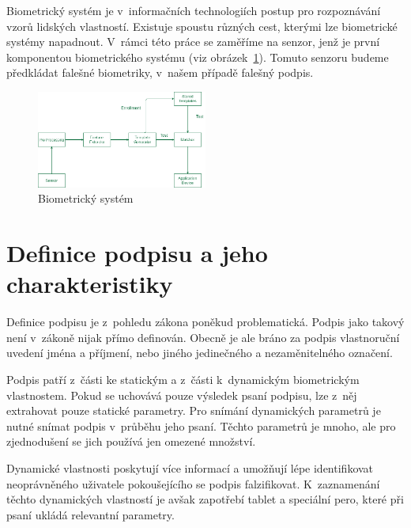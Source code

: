 Biometrický systém je v~informačních technologiích postup pro rozpoznávání vzorů lidských vlastností.       %
Existuje spoustu různých cest, kterými lze biometrické systémy napadnout.                                   %
V~rámci této práce se zaměříme na senzor, jenž je první komponentou biometrického systému (viz obrázek~\ref{fig:biometricky_system}). %
Tomuto senzoru budeme předkládat falešné biometriky, v~našem případě falešný podpis.~\cite{DrahanskýMartin2011}%

\begin{figure}[h]
  \centering
  \includegraphics[width=0.5\textwidth]{obrazky-figures/biometricky_system.png}
  \caption{Biometrický systém~\cite{geeksforGeeks2022}}  %
  \label{fig:biometricky_system}
\end{figure}

\section{Definice podpisu a jeho charakteristiky}
Definice podpisu je z~pohledu zákona poněkud problematická. 
Podpis jako takový není v~zákoně nijak přímo definován. 
Obecně je ale bráno za podpis vlastnoruční uvedení jména a příjmení, nebo jiného jedinečného a nezaměnitelného označení.~\cite{Fulsoft2023} %

Podpis patří z~části ke statickým a z~části k~dynamickým biometrickým vlastnostem.
Pokud se uchovává pouze výsledek psaní podpisu, lze z~něj extrahovat pouze statické parametry.
Pro snímání dynamických parametrů je nutné snímat podpis v~průběhu jeho psaní.
Těchto parametrů je mnoho, ale pro zjednodušení se jich používá jen omezené množství.

Dynamické vlastnosti poskytují více informací a umožňují lépe identifikovat neoprávněného uživatele pokoušejícího se podpis falzifikovat.    %
K~zaznamenání těchto dynamických vlastností je avšak zapotřebí tablet a speciální pero, které při psaní ukládá relevantní parametry.~\cite{DrahanskýMartin2011}  %

